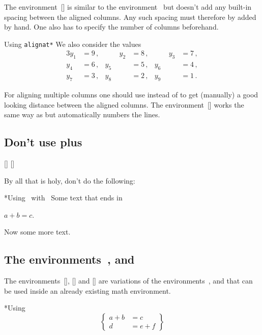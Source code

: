 The environment~[\envname] is similar to the environment~ but doesn’t add any built-in spacing between the aligned columns.
Any such spacing must therefore by added by hand.
One also has to specify the number of columns beforehand.
\begin{showlatex}{Using \texttt{alignat*}}
We also consider the values
\begin{alignat*}{3}
  y_1 &= 9 \,,  &\qquad   y_2 &= 8 \,,  &\qquad   y_3 &= 7 \,,  \\
  y_4 &= 6 \,,  &         y_5 &= 5 \,,  &         y_6 &= 4 \,,  \\
  y_7 &= 3 \,,  &         y_8 &= 2 \,,  &         y_9 &= 1 \,.
\end{alignat*}
\end{showlatex}
For aligning multiple columns one should use  instead of  to get (manually) a good looking distance between the aligned columns.
The environment~[\envname] works the same way as  but automatically numbers the lines.



\subsection{Don’t use  plus \inlinecodetitle{\$ \$}}
[\envname]
\massindex{\$ \$}[\inlinecode]

By all that is holy, don’t do the following:
\begin{showlatex}*{Using~ with~\inlinecode{\$ \$}}
Some text that ends in
\begin{center}
  $a + b = c$.
\end{center}
Now some more text.
\end{showlatex}



\subsection{The environments~,  and }

The environments~[\envname], [\envname] and [\envname] are variations of the environments~,  and  that can be used inside an already existing math environment.
\begin{showlatex}*{Using }
\[
  \left\{
    \begin{aligned}
      a + b &= c      \\
      d     &= e + f
    \end{aligned}
  \right\}
\]
\end{showlatex}



